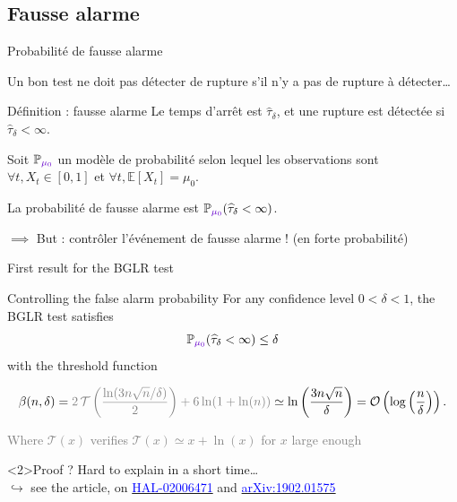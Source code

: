 \documentclass[11pt,french,ignorenonframetext,]{beamer}
\begin{document}
\subsection{\hfill{}Fausse alarme\hfill{}}

\begin{frame}{Probabilité de fausse alarme}

  Un bon test ne doit pas détecter de rupture s'il n'y a pas de rupture à détecter\ldots

  \pause
  \begin{block}{Définition : fausse alarme}
    Le temps d'arrêt est $\widehat{\tau}_\delta$,
    et une rupture est détectée si $\widehat{\tau}_\delta < \infty$.

    Soit $\mathbb{P}_{\textcolor{deeppurple}{\mu_0}}$ un modèle de probabilité selon lequel les observations sont $\forall t, X_t \in[0,1]$
    et \textcolor{deeppurple}{$\forall t, \mathbb{E}[X_t] = \mu_0$}.

    La \alert{probabilité de fausse alarme} est $\mathbb{P}_{\textcolor{deeppurple}{\mu_0}}(\widehat{\tau}_\delta < \infty)$.
  \end{block}

  \alert{$\implies$ But : contrôler l'événement de fausse alarme !} (en forte probabilité)

\end{frame}

\begin{frame}{First result for the BGLR test \dSmiley{}}

  \begin{block}{Controlling the false alarm probability}
    For any \alert{confidence level} $0<\delta<1$,
    the BGLR test satisfies
    \[ \mathbb{P}_{\textcolor{deeppurple}{\mu_0}}(\widehat{\tau}_\delta < \infty) \leq \delta \]
    with the threshold function
    \begin{small}
      \[ \beta(n,\delta) = \textcolor{gray}{2\,\mathcal{T}\left(\frac{\ln(3n\sqrt{n}/\delta)}{2}\right) + 6\ln(1+\ln(n))} \simeq \ln\left(\frac{3n \sqrt{n}}{\delta}\right) = \mathcal{O}\left(\log\left(\frac{n}{\delta}\right)\right).\]
    \end{small}
    \begin{footnotesize}
      \textcolor{gray}{Where $\mathcal{T}(x)$ verifies $\mathcal{T}(x)\simeq x + \ln(x)$ for $x$ large enough}
    \end{footnotesize}
  \end{block}


  \begin{exampleblock}<2>{Proof ?}
    Hard to explain in a short time\ldots\\
    $\hookrightarrow$ see the article, on
    \href{https://hal.inria.fr/hal-02006471}{\textcolor{blue}{HAL-02006471}}
    and
    \href{https://arxiv.org/abs/1902.01575}{\textcolor{blue}{arXiv:1902.01575}}
  \end{exampleblock}

\end{frame}
\end{document}
